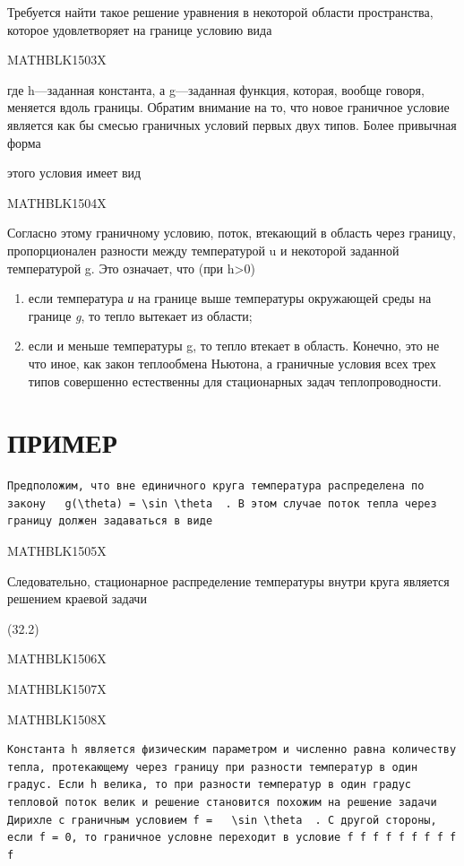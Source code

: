 \documentclass[
]{article}
\begin{document}
Требуется найти такое решение уравнения в некоторой области
пространства, которое удовлетворяет на границе условию вида

MATHBLK1503X

где h---заданная константа, а g---заданная функция, которая, вообще
говоря, меняется вдоль границы. Обратим внимание на то, что новое
граничное условие является как бы смесью граничных условий первых двух
типов. Более привычная форма

этого условия имеет вид

MATHBLK1504X

Согласно этому граничному условию, поток, втекающий в область через
границу, пропорционален разности между температурой u и некоторой
заданной температурой g. Это означает, что (при h\textgreater0)

\begin{enumerate}
\def\labelenumi{\arabic{enumi})}
\item
  если температура \emph{и} на границе выше температуры окружающей среды
  на границе \emph{g}, то тепло вытекает из области;
\item
  если и меньше температуры g, то тепло втекает в область. Конечно, это
  не что иное, как закон теплообмена Ньютона, а граничные условия всех
  трех типов совершенно естественны для стационарных задач
  теплопроводности.
\end{enumerate}

\section{ПРИМЕР}\label{ux43fux440ux438ux43cux435ux440-1}

\begin{verbatim}
Предположим, что вне единичного круга температура распределена по закону   g(\theta) = \sin \theta  . В этом случае поток тепла через границу должен задаваться в виде
\end{verbatim}

MATHBLK1505X

Следовательно, стационарное распределение температуры внутри круга
является решением краевой задачи

(32.2)

MATHBLK1506X

MATHBLK1507X

MATHBLK1508X

\begin{verbatim}
Константа h является физическим параметром и численно равна количеству тепла, протекающему через границу при разности температур в один градус. Если h велика, то при разности температур в один градус тепловой поток велик и решение становится похожим на решение задачи Дирихле с граничным условием f =   \sin \theta  . С другой стороны, если f = 0, то граничное условне переходит в условие f f f f f f f f f f
\end{verbatim}
\end{document}
